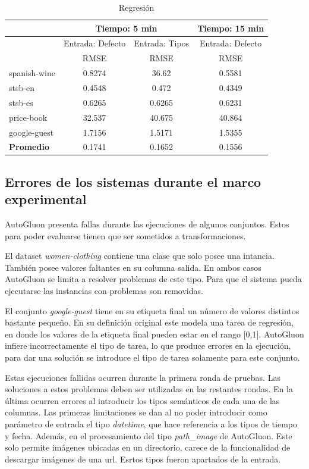 \begin{table}
  \centering
  \resizebox{15cm}{!} {
  \begin{tabular}{|l|ccc|}
  \hline
  & \multicolumn{2}{p{8cm}|}{Tiempo: 5 min}  & \multicolumn{1}{p{4cm}|}{Tiempo: 15 min}\\  \hline
  & \multicolumn{1}{p{4cm}|}{Entrada: Defecto} & \multicolumn{1}{p{4cm}|}{Entrada: Tipos} & \multicolumn{1}{p{4cm}|}{Entrada: Defecto}\\ \hline
               & RMSE  & RMSE  & RMSE  \\ \hline
  spanish-wine & 0.8274  & 36.62  & 0.5581 \\
  stsb-en      & 0.4548  & 0.472  & 0.4349 \\
  stsb-es      & 0.6265  & 0.6265 & 0.6231   \\ 
  price-book   & 32.537  & 40.675 & 40.864  \\
  google-guest & 1.7156  & 1.5171 & 1.5355  \\ \hline
  \textbf{Promedio} & 0.1741 & 0.1652 & 0.1556 \\ \hline

\end{tabular}
  \caption{Regresión}
  \label{fig:regression}
  }
\end{table}


\subsection{Errores de los sistemas durante el marco experimental}\label{subsection:errors}
AutoGluon presenta fallas durante las ejecuciones de algunos conjuntos. Estos para poder evaluarse tienen que ser sometidos a transformaciones.

El dataset \textit{women-clothing} contiene una clase que solo posee una intancia. También posee valores faltantes en su columna salida. En ambos casos AutoGluon se 
limita a resolver problemas de este tipo. Para que el sistema pueda ejecutarse las instancias con problemas son removidas.

El conjunto \textit{google-guest} tiene en su etiqueta final un número de valores distintos bastante pequeño. En su definición original este modela una tarea de regresión, en 
donde los valores de la etiqueta final pueden estar en el rango [0,1]. AutoGluon infiere incorrectamente el tipo de tarea, lo que produce errores en la ejecución, para 
dar una solución se introduce el tipo de tarea solamente para este conjunto.

Estas ejecuciones fallidas ocurren durante la primera ronda de pruebas. Las soluciones a estos problemas deben ser utilizadas en las restantes rondas. 
En la última ocurren errores al introducir los tipos semánticos de cada una de las columnas. Las primeras limitaciones se dan al no poder introducir como 
parámetro de entrada el tipo \textit{datetime}, que hace referencia a los tipos de tiempo y fecha. Además, en el procesamiento del tipo \textit{path\_image} de AutoGluon. 
Este solo permite imágenes ubicadas en un directorio, carece de la funcionalidad de descargar imágenes de una url.  Esrtos tipos fueron apartados de la entrada.

